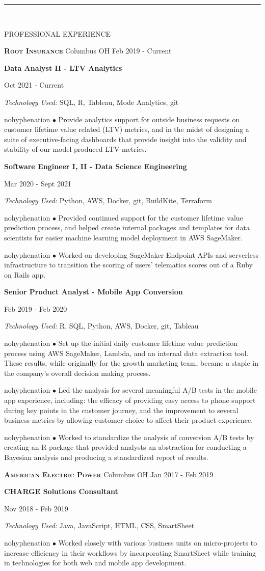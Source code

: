 \documentclass[12pt]{article}
\newcommand{\tab}[1][1cm]{\hspace*{#1}}
\newcommand{\header}[1]{
    \vspace*{-2mm}
    \rule{6.5in}{3pt} \\
    \smallskip
    \begin{large}
	    \textsc{\textcolor{lblue}{#1}}
    \end{large}
    \bigskip
}
\newcommand{\company}[4]{
    \textsc{\textbf{#1}} \tab \small {#2} \hfill \small {#3 {-} #4} \\
    \medskip
}
\newcommand{\position}[4]{
    \tab \textbf{#1} \hfill {\footnotesize #2 {-} #3 \par}
    \tab[1.25cm] \textit{Technology Used:} #4 \\
    \vspace*{0.5mm}
}
\newcommand{\bulletpoint}[1]{
  \begin{hyphenrules}{nohyphenation}
  	\hangindent=1.8cm \rightskip=2.5cm \tab[1.3cm] $\bullet$#1 \\
  \end{hyphenrules}
  \medskip
}
\begin{document}
  \begin{flushleft}
    \header{PROFESSIONAL EXPERIENCE}

    \company{Root Insurance}{Columbus OH}{Feb 2019}{Current}

    \position{Data Analyst II - LTV Analytics}{Oct 2021}{Current}{SQL, R, Tableau, Mode Analytics, git}
    \bulletpoint{
    	Provide analytics support for outside business requests on customer
	lifetime value related (LTV) metrics, and in the midst of designing a suite
	of executive-facing dashboards that provide insight into the validity and
	stability of our model produced LTV metrics.
    }
    \medskip

    \position{Software Engineer I, II - Data Science Engineering}{Mar 2020}{Sept 2021}{Python, AWS, Docker, git, BuildKite, Terraform}
    \bulletpoint{
    	Provided continued support for the customer lifetime value prediction process,
	and helped create internal packages and templates for data scientists for easier
	machine learning model deployment in AWS SageMaker.
    }
    \bulletpoint{
    	Worked on developing SageMaker Endpoint APIs and serverless infrastructure
	to transition the scoring of users' telematics scores out of a Ruby on Rails app.
    }
    \medskip

    \position{Senior Product Analyst - Mobile App Conversion}{Feb 2019}{Feb 2020}{R, SQL, Python, AWS, Docker, git, Tableau}
    \bulletpoint{
    	Set up the initial daily customer lifetime value prediction process using AWS SageMaker,
	Lambda, and an internal data extraction tool. These results, while originally for the growth
	marketing team, became a staple in the company's overall decision making process.
    }
    \bulletpoint{
    	Led the analysis for several meaningful A/B tests in the mobile app experience, including:
	the efficacy of providing easy access to phone support during key points in the customer
	journey, and the improvement to several business metrics by allowing customer choice
	to affect their product experience.
    }
    \bulletpoint{
    	Worked to standardize the analysis of conversion A/B tests by creating an R package
	that provided analysts an abstraction for conducting a Bayesian analysis and producing
	a standardized report of results.
    }
    \medskip


    \company{American Electric Power}{Columbus OH}{Jan 2017}{Feb 2019}
    
    \position{CHARGE Solutions Consultant}{Nov 2018}{Feb 2019}{Java, JavaScript, HTML, CSS, SmartSheet}
    \bulletpoint{
    	Worked closely with various business units on micro-projects to increase efficiency
	in their workflows by incorporating SmartSheet while training in technologies for both
	web and mobile app development.
    }
    \medskip


\end{flushleft}
\end{document}
